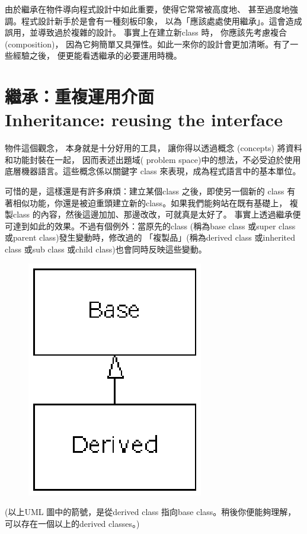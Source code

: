 由於繼承在物件導向程式設計中如此重要，使得它常常被高度地、
甚至過度地強調。程式設計新手於是會有一種刻板印象，
以為「應該處處使用繼承」。這會造成誤用，並導致過於複雜的設計。
事實上在建立新class 時， 你應該先考慮複合(composition)，
因為它夠簡單又具彈性。如此一來你的設計會更加清晰。有了一些經驗之後，
便更能看透繼承的必要運用時機。
\section{繼承：重複運用介面 \\ Inheritance: reusing the interface}
物件這個觀念， 本身就是十分好用的工具， 讓你得以透過概念
(concepts) 將資料和功能封裝在一起， 因而表述出題域( problem
space)中的想法，不必受迫於使用底層機器語言。這些概念係以關鍵字
class 來表現，成為程式語言中的基本單位。

可惜的是，這樣還是有許多麻煩：建立某個class 之後，即使另一個新的
class 有著相似功能，你還是被迫重頭建立新的class。如果我們能夠站在既有基礎上，
複製class 的內容，然後這邊加加、那邊改改，可就真是太好了。
事實上透過繼承便可達到如此的效果。不過有個例外：當原先的class
(稱為base class 或super class 或parent class)發生變動時，修改過的
「複製品」(稱為derived class 或inherited class 或sub class 或child
class)也會同時反映這些變動。

\begin{figure}[htbp]
\centering
\includegraphics{eps/TIJ205.eps}
\end{figure}

(以上UML 圖中的箭號，是從derived class 指向base class。稍後你便能夠理解，
可以存在一個以上的derived classes。)

